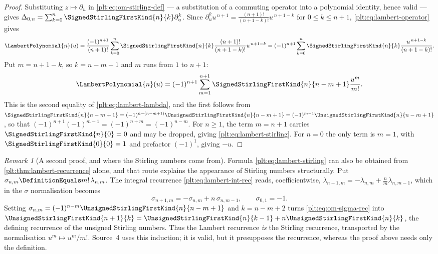 \documentclass[11pt,oneside]{article}
\theoremstyle{plain}
\theoremstyle{definition}
\theoremstyle{remark}
\newtheorem{remark}[theorem]{Remark}
\newcommand{\shiftop}[2]{\Delta_{#1,#2}}                 %
\newcommand{\stirlingone}[2]{\UnsignedStirlingFirstKind{#1}{#2}}
\newcommand{\stirlingsigned}[2]{\SignedStirlingFirstKind{#1}{#2}}
\newcommand{\LamP}[1]{\LambertPolynomial{#1}}
\begin{document}
\begin{proof}
Substituting \(z\mapsto\partial_u\) in \eqref{plt:eq:om-stirling-def} --- a
substitution of a commuting operator into a polynomial identity, hence valid
--- gives
\(\shiftop{0}{n}=\sum_{k=0}^{n}\stirlingsigned{n}{k}\partial_u^{k}\).
Since \(\partial_u^{k}u^{\,n+1}=\frac{(n+1)!}{(n+1-k)!}u^{\,n+1-k}\) for
\(0\le k\le n+1\), \eqref{plt:eq:lambert-operator} gives
\[
 \LamP{n}(u)
 =\frac{(-1)^{n+1}}{(n+1)!}\sum_{k=0}^{n}\stirlingsigned{n}{k}
  \frac{(n+1)!}{(n+1-k)!}u^{\,n+1-k}
 =(-1)^{n+1}\sum_{k=0}^{n}\stirlingsigned{n}{k}\frac{u^{\,n+1-k}}{(n+1-k)!} .
\]
Put \(m=n+1-k\), so \(k=n-m+1\) and \(m\) runs from \(1\) to \(n+1\):
\[
 \LamP{n}(u)=(-1)^{n+1}\sum_{m=1}^{n+1}\stirlingsigned{n}{n-m+1}\frac{u^{m}}{m!}.
\]
This is the second equality of \eqref{plt:eq:lambert-lambda}, and the first
follows from
\(\stirlingsigned{n}{n-m+1}=(-1)^{n-(n-m+1)}\stirlingone{n}{n-m+1}
=(-1)^{m-1}\stirlingone{n}{n-m+1}\),
so that \((-1)^{n+1}(-1)^{m-1}=(-1)^{n+m}=(-1)^{n-m}\).  For \(n\ge1\), the
term \(m=n+1\) carries \(\stirlingsigned{n}{0}=0\) and may be dropped,
giving \eqref{plt:eq:lambert-stirling}.  For \(n=0\) the only term is
\(m=1\), with \(\stirlingsigned{0}{0}=1\) and prefactor \((-1)^{1}\), giving
\(-u\).
\end{proof}

\begin{remark}[A second proof, and where the Stirling numbers come from]
\label{plt:rmk:om-stirling-second}
Formula \eqref{plt:eq:lambert-stirling} can also be obtained from
\cref{plt:thm:lambert-recurrence} alone, and that route explains the
appearance of Stirling numbers structurally.  Put
\(\sigma_{n,m}\DefinitionEquals m!\,\lambda_{n,m}\).  The integral recurrence
\eqref{plt:eq:lambert-int-rec} reads, coefficientwise,
\(\lambda_{n+1,m}=-\lambda_{n,m}+\frac{n}{m}\lambda_{n,m-1}\), which in the
\(\sigma\) normalisation becomes
\begin{equation}\label{plt:eq:om-sigma-rec}
 \sigma_{n+1,m}=-\sigma_{n,m}+n\,\sigma_{n,m-1},
 \qquad \sigma_{0,1}=-1 .
\end{equation}
Setting \(\sigma_{n,m}=(-1)^{n-m}\stirlingone{n}{n-m+1}\) and \(k=n-m+2\)
turns \eqref{plt:eq:om-sigma-rec} into
\(\stirlingone{n+1}{k}=\stirlingone{n}{k-1}+n\stirlingone{n}{k}\), the
defining recurrence of the unsigned Stirling numbers.  Thus the Lambert
recurrence \emph{is} the Stirling recurrence, transported by the
normalisation \(u^{m}\mapsto u^{m}/m!\).  Source~4 uses this induction; it is
valid, but it presupposes the recurrence, whereas the proof above needs only
the definition.
\end{remark}
\end{document}
